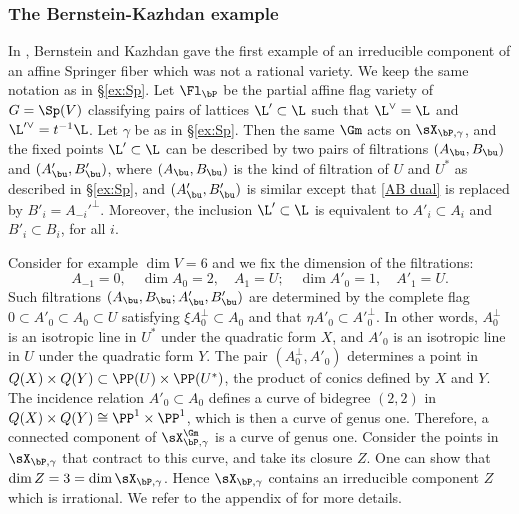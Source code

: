 \subsubsection{The Bernstein-Kazhdan example}\label{sss:BK example} In \cite[Appendix]{KL}, Bernstein and Kazhdan gave the first example of an irreducible component of an affine Springer fiber which was not a rational variety. We keep the same notation as in \S\ref{ex:Sp}. Let $\Fl_{\bP}$ be the partial affine flag variety of $G=\Sp(V)$ classifying pairs of lattices $\L'\subset\L$ such that $\L^{\vee}=\L$ and $\L'^{\vee}=t^{-1}\L$.
Let $\gamma$ be as in \S\ref{ex:Sp}. Then the same $\Gm$ acts on $\sX_{\bP,\gamma}$, and the fixed points $\L'\subset \L$ can be described by two pairs of filtrations $(A_{\bu}, B_{\bu})$ and $(A'_{\bu}, B'_{\bu})$, where $(A_{\bu}, B_{\bu})$ is the kind of filtration of $U$ and $U^{*}$ as described in \S\ref{ex:Sp}, and $(A'_{\bu}, B'_{\bu})$ is similar except that \eqref{AB dual} is replaced by $B'_{i}=A_{-i}'^{\bot}$. Moreover, the inclusion $\L'\subset \L$ is equivalent to $A'_{i}\subset A_{i}$ and $B'_{i}\subset B_{i}$, for all $i$.

Consider for example $\dim V=6$ and we fix the dimension of the filtrations:
\begin{equation*}
A_{-1}=0, \quad \dim A_{0}=2, \quad A_{1}=U;\quad  \dim A'_{0}=1, \quad A'_{1}=U.
\end{equation*}
Such filtrations $(A_{\bu}, B_{\bu}; A'_{\bu}, B'_{\bu})$ are determined by the complete flag $0\subset A'_{0}\subset A_{0}\subset U$ satisfying $\xi A^{\bot}_{0}\subset A_{0}$ and that $\eta A'_{0}\subset A'^{\bot}_{0}$. In other words,  $A^{\bot}_{0}$ is an isotropic line in $U^{*}$ under the quadratic form $X$, and $A'_{0}$ is an isotropic line in $U$ under the quadratic form $Y$. The pair $(A^{\bot}_{0}, A'_{0})$ determines a point in $Q(X)\times Q(Y)\subset \PP(U)\times\PP(U^{*})$, the product of conics defined by $X$ and $Y$. The incidence relation $A'_{0}\subset A_{0}$ defines a curve of bidegree $(2,2)$ in $Q(X)\times Q(Y)\cong\PP^{1}\times \PP^{1}$, which is then a curve of genus one. Therefore, a connected component of $\sX^{\Gm}_{\bP,\gamma}$ is a curve of genus  one. Consider the points in $\sX_{\bP,\gamma}$ that contract to this curve, and take its closure $Z$. One can show that $\dim Z=3=\dim\sX_{\bP,\gamma}$. Hence $\sX_{\bP,\gamma}$ contains an irreducible component $Z$ which is irrational. We refer to the appendix of \cite{KL} for more details.



